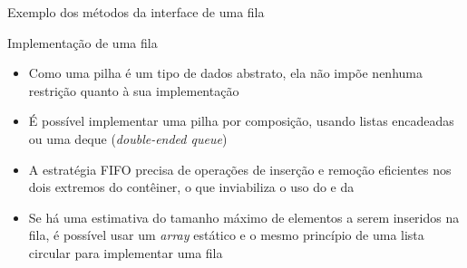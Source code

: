 \begin{frame}[fragile]{Exemplo dos métodos da interface de uma fila}


\end{frame}

\begin{frame}[fragile]{Implementação de uma fila}

    \begin{itemize}
        \item Como uma pilha é um tipo de dados abstrato, ela não impõe nenhuma restrição
            quanto à sua implementação

        \item É possível implementar uma pilha por composição, usando listas encadeadas ou uma
            deque (\textit{double-ended queue})

        \item A estratégia FIFO precisa de operações de inserção e remoção eficientes nos
            dois extremos do contêiner, o que inviabiliza o uso do  e da

        \item Se há uma estimativa do tamanho máximo de elementos a serem inseridos na fila,
            é possível usar um \textit{array} estático e o mesmo princípio de uma lista circular 
            para implementar uma fila
    \end{itemize}

\end{frame}

